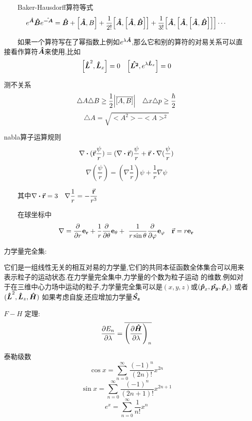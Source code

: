 \documentclass{article}
\begin{document}
\begin{formal}
            $\qquad$Baker-Hausdorff算符等式
            $$ 
            e^{\vu*{A}} \vu*{B} e^{\vu*{-A}} = \vu*{B} + \comm{\vu*{A}}{B} + \frac{1}{2!} \comm{\vu*{A}}{\comm{\vu*{A}}{\vu*{B}}} + 
            \frac{1}{3!} \comm{\vu*{A}}{\comm{\vu*{A}}{\comm{\vu*{A}}{\vu*{B}}}} \cdots 
            $$


            $\qquad$如果一个算符写在了幂指数上例如$e^{\lambda \vu*{A}}$,那么它和别的算符的对易关系可以直接看作算符$\vu*{A}$来使用,比如
            $$ \comm{\vu*{L}^{2}}{\vu*{L}_{x}} = 0 \quad \comm{\vu*{L^{2}}}{e^{\lambda \vu*{L}_{x}}} = 0 $$
        
            
            测不关系
            $$ \triangle{A} \triangle{B} \geq \frac{1}{2} \abs{\overline{\comm{A}{B}}} \quad \triangle{x} \triangle{p} \geq \frac{\hbar}{2}   $$
            $$ \triangle{A} = \sqrt{<A^{2}> - <A>^{2}} $$
            
            nabla算子运算规则
            $$ \nabla \vdot (\va{r} \frac{\psi}{r})  =  (\nabla \vdot \va{r}) \frac{\psi}{r} + \va{r} \vdot \nabla(\frac{\psi}{r}) $$
            $$ \nabla (\frac{\psi}{r}) = (\nabla \frac{1}{r})\psi + \frac{1}{r} \nabla \psi $$
            
            $\qquad$其中$ \nabla \vdot \va{r} = 3 \quad \nabla \dfrac{1}{r} = - \dfrac{\va{r}}{r^{3}} $

            $\qquad$在球坐标中
            $$ \nabla =  \pdv{r} \vb{e_{r}} +  \frac{1}{r} \pdv{\theta} \vb{e_{\theta}} + \ \frac{1}{r \sin{\theta}} \pdv{\varphi} \vb{e_{\varphi}} \quad \va{r} = r \vb{e_{r}}  $$         

            力学量完全集:
            
            \indent 它们是一组线性无关的相互对易的力学量,它们的共同本征函数全体集合可以用来表示粒子的运动状态.在力学量完全集中,力学量的个数为粒子运动
            的维数.例如对于在三维中心力场中运动的粒子,力学量完全集可以是$(x,y,z)$或$(\vu*{p}_{x} , \vu*{p_{y}} , \vu*{p}_{z})$ 或者$ (\vu*{L}^{2} , \vu*{L}_{z} , \vu*{H}) $ 如果考虑自旋,还应增加力学量$\vu*{S_{z}}$

            $ F - H $ 定理:
             $$ \pdv{E_{n}}{\lambda} = \overline{\qty(\pdv{\vu*{H}}{\lambda})_{n}} $$

            泰勒级数
            $$ \cos{x} = \sum_{n=0}^{\infty} \frac{(-1)^{n}}{(2n)!} x^{2n}  $$
            $$ \sin{x} = \sum_{n=0}^{\infty} \frac{(-1)^{n}}{(2n+1)!} x^{2n+1}  $$
            $$ e^{x} = \sum_{n=0}^{\infty} \frac{1}{n!} x^{n}  $$
            
        \end{formal}
\end{document}
